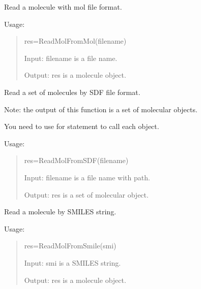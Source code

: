 \documentclass[letterpaper,10pt,english]{sphinxmanual}
\begin{document}

\begin{fulllineitems}
\label{reference/Getmol:Getmol.ReadMolFromMol}
Read a molecule with mol file format.

Usage:
\begin{quote}

res=ReadMolFromMol(filename)

Input: filename is a file name.

Output: res is a molecule object.
\end{quote}

\end{fulllineitems}


\begin{fulllineitems}
\label{reference/Getmol:Getmol.ReadMolFromSDF}
Read a set of molecules by SDF file format.

Note: the output of this function is a set of molecular objects.

You need to use for statement to call each object.

Usage:
\begin{quote}

res=ReadMolFromSDF(filename)

Input: filename is a file name with path.

Output: res is a set of molecular object.
\end{quote}

\end{fulllineitems}


\begin{fulllineitems}
\label{reference/Getmol:Getmol.ReadMolFromSmile}
Read a molecule by SMILES string.

Usage:
\begin{quote}

res=ReadMolFromSmile(smi)

Input: smi is a SMILES string.

Output: res is a molecule object.
\end{quote}

\end{fulllineitems}
\end{document}
